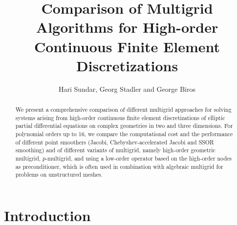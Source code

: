 \documentclass[smallcondensed,final]{svjour3}     %
\begin{document}

\title{Comparison of Multigrid Algorithms for High-order
  Continuous Finite Element Discretizations}

\author{Hari Sundar, Georg Stadler and George Biros}


\maketitle


%
\begin{abstract}
We present a comprehensive comparison of different multigrid approaches for
solving systems arising from high-order continuous finite element
discretizations of elliptic partial differential equations on complex
geometries in two and three dimensions.  For polynomial orders up to 16, we
compare the computational cost and the performance of different point smoothers
(Jacobi, Chebyshev-accelerated Jacobi and SSOR smoothing) and of different
variants of multigrid, namely high-order geometric multigrid, $p$-multigrid,
and using a low-order operator based on the high-order nodes as preconditioner,
which is often used in combination with algebraic multigrid for problems on
unstructured meshes.
\end{abstract}


\section{Introduction}
\end{document}
